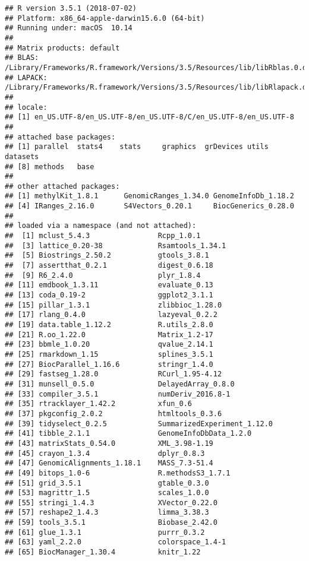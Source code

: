 \documentclass[]{article}
\begin{document}
\begin{verbatim}
## R version 3.5.1 (2018-07-02)
## Platform: x86_64-apple-darwin15.6.0 (64-bit)
## Running under: macOS  10.14
## 
## Matrix products: default
## BLAS: /Library/Frameworks/R.framework/Versions/3.5/Resources/lib/libRblas.0.dylib
## LAPACK: /Library/Frameworks/R.framework/Versions/3.5/Resources/lib/libRlapack.dylib
## 
## locale:
## [1] en_US.UTF-8/en_US.UTF-8/en_US.UTF-8/C/en_US.UTF-8/en_US.UTF-8
## 
## attached base packages:
## [1] parallel  stats4    stats     graphics  grDevices utils     datasets 
## [8] methods   base     
## 
## other attached packages:
## [1] methylKit_1.8.1      GenomicRanges_1.34.0 GenomeInfoDb_1.18.2 
## [4] IRanges_2.16.0       S4Vectors_0.20.1     BiocGenerics_0.28.0 
## 
## loaded via a namespace (and not attached):
##  [1] mclust_5.4.3                Rcpp_1.0.1                 
##  [3] lattice_0.20-38             Rsamtools_1.34.1           
##  [5] Biostrings_2.50.2           gtools_3.8.1               
##  [7] assertthat_0.2.1            digest_0.6.18              
##  [9] R6_2.4.0                    plyr_1.8.4                 
## [11] emdbook_1.3.11              evaluate_0.13              
## [13] coda_0.19-2                 ggplot2_3.1.1              
## [15] pillar_1.3.1                zlibbioc_1.28.0            
## [17] rlang_0.4.0                 lazyeval_0.2.2             
## [19] data.table_1.12.2           R.utils_2.8.0              
## [21] R.oo_1.22.0                 Matrix_1.2-17              
## [23] bbmle_1.0.20                qvalue_2.14.1              
## [25] rmarkdown_1.15              splines_3.5.1              
## [27] BiocParallel_1.16.6         stringr_1.4.0              
## [29] fastseg_1.28.0              RCurl_1.95-4.12            
## [31] munsell_0.5.0               DelayedArray_0.8.0         
## [33] compiler_3.5.1              numDeriv_2016.8-1          
## [35] rtracklayer_1.42.2          xfun_0.6                   
## [37] pkgconfig_2.0.2             htmltools_0.3.6            
## [39] tidyselect_0.2.5            SummarizedExperiment_1.12.0
## [41] tibble_2.1.1                GenomeInfoDbData_1.2.0     
## [43] matrixStats_0.54.0          XML_3.98-1.19              
## [45] crayon_1.3.4                dplyr_0.8.3                
## [47] GenomicAlignments_1.18.1    MASS_7.3-51.4              
## [49] bitops_1.0-6                R.methodsS3_1.7.1          
## [51] grid_3.5.1                  gtable_0.3.0               
## [53] magrittr_1.5                scales_1.0.0               
## [55] stringi_1.4.3               XVector_0.22.0             
## [57] reshape2_1.4.3              limma_3.38.3               
## [59] tools_3.5.1                 Biobase_2.42.0             
## [61] glue_1.3.1                  purrr_0.3.2                
## [63] yaml_2.2.0                  colorspace_1.4-1           
## [65] BiocManager_1.30.4          knitr_1.22
\end{verbatim}
\end{document}
